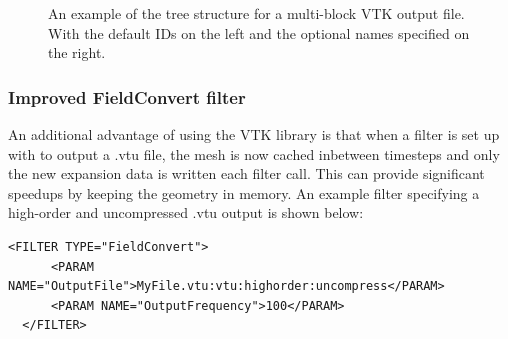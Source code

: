 \begin{figure}
\begin{minipage}{0.99\textwidth}
\begin{center}
\begin{multicols}{2}
\begin{minipage}{0.99\textwidth}
\end{minipage}
\columnbreak
\begin{minipage}{0.99\textwidth}
\vspace{\baselineskip}
\end{minipage}
\end{multicols}
\end{center}
\end{minipage}
\caption{An example of the tree structure for a multi-block VTK output file.
With the default IDs on the left and the optional names specified on the right.}
\label{fig:util:multi-block}
\end{figure}

\subsubsection{Improved FieldConvert filter}
An additional advantage of using the VTK library is that when a filter is set up
with  to output a .vtu file, the mesh is now cached inbetween
timesteps and only the new expansion data is written each  filter call. This can
provide significant speedups by keeping the geometry in memory. An example filter
specifying a high-order and uncompressed .vtu output is shown below:

\begin{lstlisting}[style=XMLStyle,gobble=2]
  <FILTER TYPE="FieldConvert">
      <PARAM NAME="OutputFile">MyFile.vtu:vtu:highorder:uncompress</PARAM>
      <PARAM NAME="OutputFrequency">100</PARAM>
  </FILTER>
\end{lstlisting}
%
